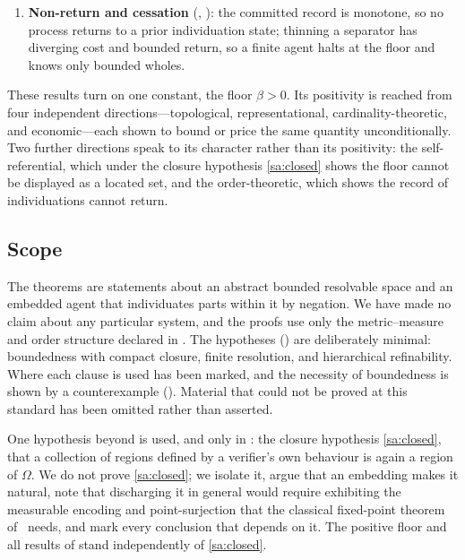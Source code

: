 \documentclass[11pt,twocolumn,a4paper]{article}
\theoremstyle{thmstyle}
\theoremstyle{definition}
\theoremstyle{remark}
\newcommand{\Space}{\Omega}
\newcommand{\thick}{\beta}
\begin{document}
\begin{enumerate}[label=(\arabic*),leftmargin=2.4em]
): no verifier is total and closed under its own
diagonal, an unconditional self-contained result; and \emph{under the explicit
closure hypothesis} \ref{sa:closed}---that a behaviour-defined collection of
regions is again a region---the irreducible residue is not an exhibitable set and
the floor can only be bounded below, never displayed. This last upgrade is stated
conditionally; the positivity of the floor (items 3--4) does not rely on it.
\item \textbf{Non-return and cessation} (,
): the committed record is monotone, so no process returns to
a prior individuation state; thinning a separator has diverging cost and bounded
return, so a finite agent halts at the floor and knows only bounded wholes.
\end{enumerate}

These results turn on one constant, the floor $\thick>0$. Its positivity is
reached from four independent directions---topological, representational,
cardinality-theoretic, and economic---each shown to bound or price the same
quantity unconditionally. Two further directions speak to its character rather
than its positivity: the self-referential, which under the closure hypothesis
\ref{sa:closed} shows the floor cannot be displayed as a located set, and the
order-theoretic, which shows the record of individuations cannot return.

\subsection{Scope}

The theorems are statements about an abstract bounded resolvable space and an
embedded agent that individuates parts within it by negation. We have made no
claim about any particular system, and the proofs use only the metric--measure
and order structure declared in . The hypotheses
() are deliberately minimal: boundedness with compact closure,
finite resolution, and hierarchical refinability. Where each clause is used has
been marked, and the necessity of boundedness is shown by a counterexample
(). Material that could not be proved at this standard
has been omitted rather than asserted.

One hypothesis beyond  is used, and only in : the
closure hypothesis \ref{sa:closed}, that a collection of regions defined by a
verifier's own behaviour is again a region of $\Space$. We do not prove
\ref{sa:closed}; we isolate it, argue that an embedding makes it natural, note
that discharging it in general would require exhibiting the measurable encoding
and point-surjection that the classical fixed-point theorem of~\citet{lawvere1969}
needs, and mark every conclusion that depends on it. The positive floor and all
results of 
stand independently of \ref{sa:closed}.
\end{document}
